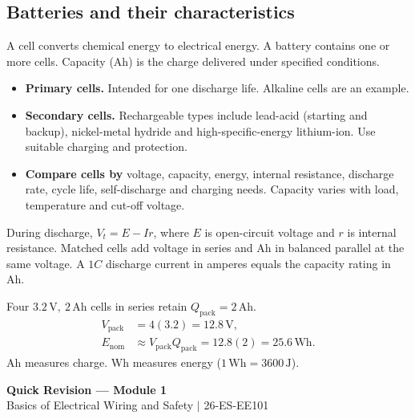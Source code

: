\documentclass[12pt,a4paper]{article}
\begin{document}
\subsection{Batteries and their characteristics}

\begin{tcolorbox}[defbox,title={Cell, battery and capacity}]
A cell converts chemical energy to electrical energy. A battery contains one or more cells. Capacity (Ah) is the charge delivered under specified conditions.
\end{tcolorbox}

\begin{itemize}[leftmargin=*, itemsep=3pt, topsep=4pt]
  \item \textbf{Primary cells.} Intended for one discharge life. Alkaline cells are an example.
  \item \textbf{Secondary cells.} Rechargeable types include lead-acid (starting and backup), nickel-metal hydride and high-specific-energy lithium-ion. Use suitable charging and protection.
  \item \textbf{Compare cells by} voltage, capacity, energy, internal resistance, discharge rate, cycle life, self-discharge and charging needs. Capacity varies with load, temperature and cut-off voltage.
\end{itemize}

During discharge, \(V_t=E-Ir\), where \(E\) is open-circuit voltage and \(r\) is internal resistance. Matched cells add voltage in series and Ah in balanced parallel at the same voltage. A \(1C\) discharge current in amperes equals the capacity rating in Ah.

\begin{tcolorbox}[examplebox,title={Series battery rating and energy}]
Four \(3.2\,\mathrm V,\ 2\,\mathrm{Ah}\) cells in series retain \(Q_{\mathrm{pack}}=2\,\mathrm{Ah}\).
\[
\begin{aligned}
V_{\mathrm{pack}} &= 4(3.2)=12.8\,\mathrm V,\\
E_{\mathrm{nom}} &\approx V_{\mathrm{pack}}Q_{\mathrm{pack}}=12.8(2)=25.6\,\mathrm{Wh}.
\end{aligned}
\]
Ah measures charge. Wh measures energy (\(1\,\mathrm{Wh}=3600\,\mathrm J\)).
\end{tcolorbox}

\newpage
\begin{center}
  {\large\bfseries\color{myred} Quick Revision --- Module 1}\\[3pt]
  {\small\color{mydark} Basics of Electrical Wiring and Safety $|$ 26-ES-EE101}
\end{center}
\noindent{\color{myred}\rule{\linewidth}{1.2pt}}
\vspace{4pt}
\end{document}
